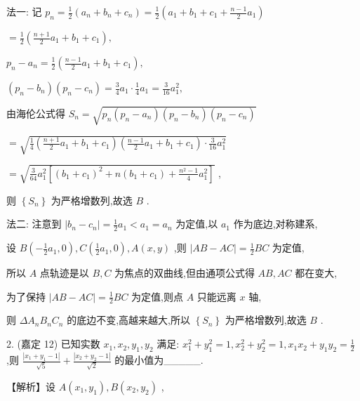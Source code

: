 \documentclass[10pt]{article}
\begin{document}
法一: 记 \({p}_{n} = \frac{1}{2}\left( {{a}_{n} + {b}_{n} + {c}_{n}}\right)  = \frac{1}{2}\left( {{a}_{1} + {b}_{1} + {c}_{1} + \frac{n - 1}{2}{a}_{1}}\right)\)

\(= \frac{1}{2}\left( {\frac{n + 1}{2}{a}_{1} + {b}_{1} + {c}_{1}}\right) ,\)

\({p}_{n} - {a}_{n} = \frac{1}{2}\left( {\frac{n - 1}{2}{a}_{1} + {b}_{1} + {c}_{1}}\right) ,\)

\(\left( {{p}_{n} - {b}_{n}}\right) \left( {{p}_{n} - {c}_{n}}\right)  = \frac{3}{4}{a}_{1} \cdot  \frac{1}{4}{a}_{1} = \frac{3}{16}{a}_{1}^{2},\)

由海伦公式得 \({S}_{n} = \sqrt{{p}_{n}\left( {{p}_{n} - {a}_{n}}\right) \left( {{p}_{n} - {b}_{n}}\right) \left( {{p}_{n} - {c}_{n}}\right) }\)

\(= \sqrt{\frac{1}{4}\left( {\frac{n + 1}{2}{a}_{1} + {b}_{1} + {c}_{1}}\right) \left( {\frac{n - 1}{2}{a}_{1} + {b}_{1} + {c}_{1}}\right)  \cdot  \frac{3}{16}{a}_{1}^{2}}\)

\(= \sqrt{\frac{3}{64}{a}_{1}^{2}\left\lbrack  {{\left( {b}_{1} + {c}_{1}\right) }^{2} + n\left( {{b}_{1} + {c}_{1}}\right)  + \frac{{n}^{2} - 1}{4}{a}_{1}^{2}}\right\rbrack  }\) ,

则 \(\left\{  {S}_{n}\right\}\) 为严格增数列,故选 \(B\) .

法二: 注意到 \(\left| {{b}_{n} - {c}_{n}}\right|  = \frac{1}{2}{a}_{1} < {a}_{1} = {a}_{n}\) 为定值,以 \({a}_{1}\) 作为底边,对称建系,

设 \(B\left( {-\frac{1}{2}{a}_{1},0}\right) ,C\left( {\frac{1}{2}{a}_{1},0}\right) ,A\left( {x,y}\right)\) ,则 \(\left| {{AB} - {AC}}\right|  = \frac{1}{2}{BC}\) 为定值,

所以 \(A\) 点轨迹是以 \(B,C\) 为焦点的双曲线,但由通项公式得 \({AB},{AC}\) 都在变大,

为了保持 \(\left| {{AB} - {AC}}\right|  = \frac{1}{2}{BC}\) 为定值,则点 \(A\) 只能远离 \(x\) 轴,

则 \(\Delta {A}_{n}{B}_{n}{C}_{n}\) 的底边不变,高越来越大,所以 \(\left\{  {S}_{n}\right\}\) 为严格增数列,故选 \(B\) .

2. (嘉定 12) 已知实数 \({x}_{1},{x}_{2},{y}_{1},{y}_{2}\) 满足: \({x}_{1}^{2} + {y}_{1}^{2} = 1,{x}_{2}^{2} + {y}_{2}^{2} = 1,{x}_{1}{x}_{2} + {y}_{1}{y}_{2} = \frac{1}{2}\) ,则 \(\frac{\left| {x}_{1} + {y}_{1} - 1\right| }{\sqrt{5}} + \frac{\left| {x}_{2} + {y}_{2} - 1\right| }{\sqrt{2}}\) 的最小值为\_\_\_\_\_.

【解析】设 \(A\left( {{x}_{1},{y}_{1}}\right) ,B\left( {{x}_{2},{y}_{2}}\right)\) ,
\end{document}
